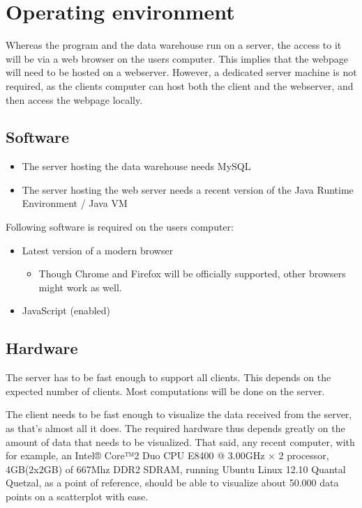 \section{Operating environment}



Whereas the program and the data warehouse run on a server,
the access to it will be via a web browser on the users computer. 
This implies that the webpage will need to be hosted on a webserver.
However, a dedicated server machine is not required, as the clients computer can host both the client and
the webserver, and then access the webpage locally.



\subsection{Software}
\begin{itemize}
  \item The server hosting the data warehouse needs MySQL %
  
  \item The server hosting the web server needs a 
  recent version of the Java Runtime Environment / Java VM  %
\end{itemize}


Following software is required on the users computer:
\begin{itemize}
  \item Latest version of a modern browser
  \begin{itemize}
    \item Though Chrome and Firefox will be officially supported, other browsers might work as well.
  \end{itemize}
  \item JavaScript (enabled)
\end{itemize}



\subsection{Hardware}

The server has to be fast enough to support all clients. This depends on
the expected number of clients. Most computations will be done on the server.

The client needs to be fast enough to visualize the data received from the server, as that's almost all it does.
The required hardware thus depends greatly on the amount of data that needs to be 
visualized. That said, any recent computer, with for example, 
an Intel® Core™2 Duo CPU E8400 @ 3.00GHz × 2 processor, 
4GB(2x2GB) of 667Mhz DDR2 SDRAM, running Ubuntu Linux 12.10 Quantal Quetzal, 
as a point of reference, should be able to visualize about 50.000 
data points on a scatterplot with ease.


